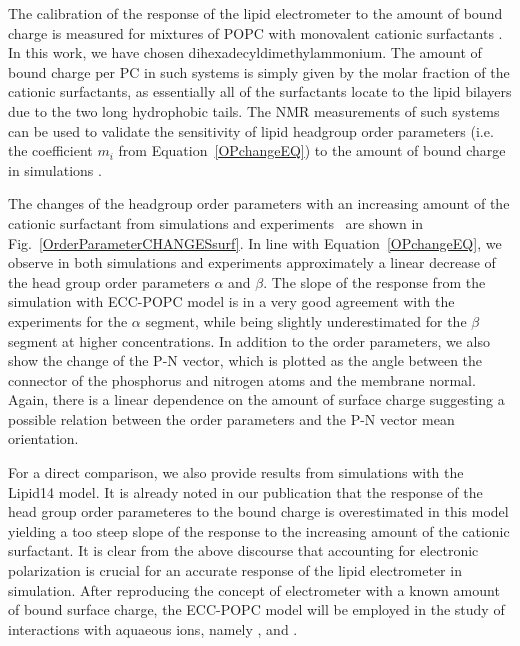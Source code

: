 The calibration of the response of the lipid electrometer to the amount of bound charge 
is measured for mixtures of POPC with monovalent cationic surfactants \citep{scherer89}.
In this work, we have chosen dihexadecyldimethylammonium. 
The amount of bound charge per PC 
in such systems is simply given by the molar fraction of the cationic surfactants, 
as essentially all of the surfactants locate to the lipid bilayers 
due to the two long hydrophobic tails.
The NMR measurements of such systems  
can be used to validate the sensitivity of lipid headgroup order parameters 
(i.e. the coefficient $m_i$ from Equation~\ref{OPchangeEQ}) 
to the amount of bound charge in simulations \citep{scherer89}.

The changes of the headgroup order parameters with an increasing amount of 
the cationic surfactant from simulations and experiments~\citep{scherer89} are shown in Fig.~\ref{OrderParameterCHANGESsurf}.
In line with Equation~\ref{OPchangeEQ},
we observe in both simulations and experiments approximately a linear decrease of the head group order parameters $\alpha$ and $\beta$.
The slope of the response from the simulation with ECC-POPC model 
is in a very good agreement with the experiments for the $\alpha$ segment, 
while being slightly underestimated for the $\beta$ segment at higher concentrations.
In addition to the order parameters, we also show the change of the P-N vector, 
which is plotted as the angle between the connector of the phosphorus and nitrogen atoms and the membrane normal. 
Again, there is a linear dependence on the amount of surface charge
suggesting a possible relation between the order parameters and the P-N vector mean orientation. 

For a direct comparison, we also provide results from simulations with the Lipid14 model. 
It is already noted in our publication \citep{melcr18} that
the response of the head group order parameteres to the bound charge 
is overestimated in this model yielding a too steep slope of the response to the increasing amount of the cationic surfactant. 
It is clear from the above discourse that accounting for electronic polarization is crucial for an accurate response of the lipid electrometer in simulation. 
After reproducing the concept of electrometer with a known amount of bound surface charge,
the ECC-POPC model will be employed in the study of interactions with aquaeous ions, namely ,  and . 









